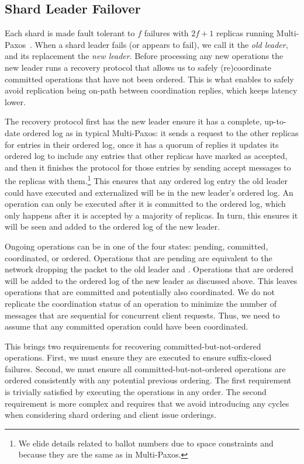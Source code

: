 \subsection{Shard Leader Failover}
\label{subsec:leaderfailures}
Each shard is made fault tolerant to $f$ failures with $2f+1$ replicas running Multi-Paxos~\cite{lamport1998paxos}.
When a shard leader fails (or appears to fail), we call it the \textit{old leader}, and its replacement the \textit{new leader}.
Before processing any new operations the new leader runs a recovery protocol that allows us to safely (re)coordinate committed operations that have not been ordered.
This is what enables \sys{} to safely avoid replication being on-path between coordination replies, which keeps latency lower.

The recovery protocol first has the new leader ensure it has a complete, up-to-date ordered log as in typical Multi-Paxos:
it sends a request to the other replicas for entries in their ordered log,
once it has a quorum of replies it updates its ordered log to include any entries that other replicas have marked as accepted,
and then it finishes the protocol for those entries by sending accept messages to the replicas with them.\footnote{We elide details related to ballot numbers due to space constraints and because they are the same as in Multi-Paxos.}
This ensures that any ordered log entry the old leader could have executed and externalized will be in the new leader's ordered log.
An operation can only be executed after it is committed to the ordered log,
which only happens after it is accepted by a majority of replicas. In turn, this
ensures it will be seen and added to the ordered log of the new leader.

Ongoing operations can be in one of the four states: pending, committed, coordinated, or ordered.
Operations that are pending are equivalent to the network dropping the packet to the old leader and .
Operations that are ordered will be added to the ordered log of the new leader as discussed above.
This leaves operations that are committed and potentially also coordinated.
We do not replicate the coordination status of an operation to minimize the number of messages that are sequential for concurrent client requests.
Thus, we need to assume that any committed operation could have been coordinated.

This brings two requirements for recovering committed-but-not-ordered operations.
First, we must ensure they are executed to ensure suffix-closed failures.
%
Second, we must ensure all committed-but-not-ordered operations are ordered consistently with any potential previous ordering.
The first requirement is trivially satisfied by executing the operations in any order.
The second requirement is more complex and requires that we avoid introducing any cycles when considering shard ordering and client issue orderings.

